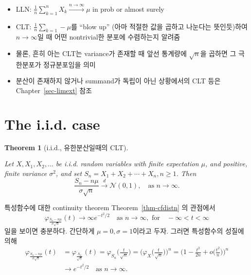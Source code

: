 \documentclass[
  13pt,
  letterpaper,
  DIV=11,
  numbers=noendperiod]{scrreprt}
\theoremstyle{plain}
\theoremstyle{definition}
\theoremstyle{definition}
\theoremstyle{plain}
\theoremstyle{definition}
\theoremstyle{plain}
\newtheorem{theorem}{Theorem}[chapter]
\theoremstyle{remark}
\begin{document}
\begin{itemize}
\item
  LLN:
  \(\frac{1}{n}\sum_{k=1}^n X_k \stackrel{n\rightarrow\infty}{\longrightarrow} \mu\)
  in prob or almost surely
\item
  CLT: \(\frac{1}{n}\sum_{k=1}-\mu\)를 ``blow up'' (아마 적절한 값을
  곱하고 나눈다는 뜻인듯)하여 \(n\rightarrow \infty\)일 때 어떤
  nontrivial한 분포에 수렴하는지 알려줌
\item
  물론, 흔히 아는 CLT는 variance가 존재할 때 앞선 통계량에
  \(\sqrt{n}\)을 곱하면 그 극한분포가 정규분포임을 의미
\item
  분산이 존재하지 않거나 summand가 독립이 아닌 상황에서의 CLT 등은
  Chapter~\ref{sec-limext} 참조
\end{itemize}

\section{The i.i.d. case}\label{the-i.i.d.-case}

\begin{theorem}[i.i.d., 유한분산일때의
CLT]\protect\hypertarget{thm-clt}{}\label{thm-clt}

Let \(X, X_1, X_2, \ldots\) be i.i.d. random variables with finite
expectation \(\mu\), and positive, finite variance \(\sigma^2\), and set
\(S_n = X_1 + X_2 + \cdots + X_n, n\geq 1\). Then \[
\frac{S_n - n\mu}{\sigma \sqrt{n}} \stackrel{d}{\rightarrow}\mathcal{N}(0,1), \quad{} \text{as }n \rightarrow\infty.
\]

\end{theorem}

\begin{tcolorbox}[enhanced jigsaw, opacitybacktitle=0.6, bottomrule=.15mm, title=\textcolor{quarto-callout-note-color}{\faInfo}\hspace{0.5em}{Proof}, leftrule=.75mm, rightrule=.15mm, arc=.35mm, left=2mm, titlerule=0mm, colbacktitle=quarto-callout-note-color!10!white, bottomtitle=1mm, colframe=quarto-callout-note-color-frame, toptitle=1mm, coltitle=black, breakable, colback=white, toprule=.15mm, opacityback=0]

특성함수에 대한 continuity theorem Theorem~\ref{thm-cfdistn} 의 관점에서
\[
\varphi_{\frac{S_n - n\mu}{\sigma \sqrt{n}}} (t) \rightarrow \infty e^{-t^2/2} \quad{} \text{as }n \rightarrow\infty, \text{ for} \quad{} -\infty < t < \infty
\] 일을 보이면 충분하다. 간단하게 \(\mu=0, \sigma=1\)이라고 두자. 그러면
특성함수의 성질에 의해 \[
\begin{align*}
\varphi_{\frac{S_n - n\mu}{\sigma \sqrt{n}}} (t) &=\varphi_{\frac{S_n }{\sqrt{n}}} (t) = \varphi_{S_n}\Big( \frac{t}{\sqrt{n}} \Big) = \Big( \varphi_X \Big( \frac{t}{\sqrt{n}}\Big)\Big)^n = \Big( 1- \frac{t^2}{2n} + o\Big( \frac{t^2}{n}\Big) \Big)^n\\
&\rightarrow e^{-t^2/2} \quad{} \text{as }n \rightarrow\infty.
\end{align*}
\]

\end{tcolorbox}
\end{document}
